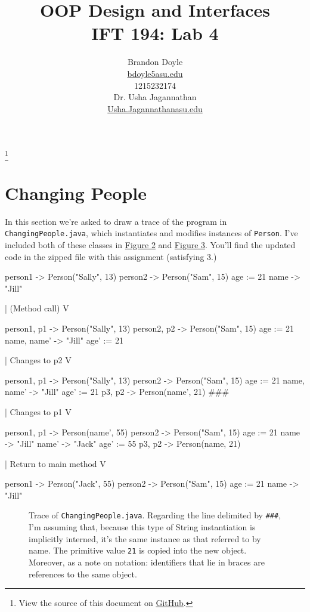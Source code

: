 \documentclass[leqno, 11pt]{article}
\title{\vspace{6ex}OOP Design and Interfaces\\
  \Large IFT 194: Lab 4}
\author{Brandon Doyle\\
\href{mailto:bdoyle@asu.edu}{bdoyle5\at{}asu.edu}\\
1215232174\\[1em]
Dr. Usha Jagannathan\\
\href{mailto:Usha.Jagannathan@asu.edu}{Usha.Jagannathan\at{}asu.edu}}
\newcommand\blfootnote[1]{%
  \begingroup
    \renewcommand\thefootnote{}\footnote{#1}
    \addtocounter{footnote}{-1}
  \endgroup
}
\begin{document}
\begin{titlepage}
\clearpage\maketitle
\thispagestyle{empty}
\end{titlepage}
\tableofcontents
\blfootnote{View the source of this document on \href{https://github.com/bjd2385/IFT_194_labs/blob/master/\jobname.tex}{GitHub}.}
\newpage
\section{Changing People}
In this section we're asked to draw a trace of the program in \texttt{ChangingPeople.java}, which instantiates and modifies instances of \texttt{Person}. I've included both of these classes in \hyperref[fig:one]{Figure 2} and \hyperref[fig:two]{Figure 3}. You'll find the updated code in the zipped file with this assignment (satisfying 3.)
\begin{verbbox}[\mbox{}\scriptsize]
person1 -> Person("Sally", 13)
person2 -> Person("Sam", 15)
age := 21
name -> "Jill"

               |  (Method call)
               V

{ person1, p1 } -> Person("Sally", 13)
{ person2, p2 } -> Person("Sam", 15)
age := 21
{ name, name' } -> "Jill"
age' := 21

               |  Changes to p2
               V

{ person1, p1 } -> Person("Sally", 13)
person2 -> Person("Sam", 15)
age := 21
{ name, name' } -> "Jill"
age' := 21
{ p3, p2 } -> Person(name', 21)  ###

               |  Changes to p1
               V

{ person1, p1 } -> Person(name', 55)
person2 -> Person("Sam", 15)
age := 21
name -> "Jill"
name' -> "Jack"
age' := 55
{ p3, p2 } -> Person(name, 21)

               |  Return to main method
               V

person1 -> Person("Jack", 55)
person2 -> Person("Sam", 15)
age := 21
name -> "Jill"
\end{verbbox}
\begin{figure}[h!]
  \centering
  \theverbbox
  \caption{Trace of \texttt{ChangingPeople.java}. Regarding the line delimited by \texttt{\#\#\#}, I'm assuming that, because this type of String instantiation is implicitly interned, it's the same instance as that referred to by name. The primitive value \texttt{21} is copied into the new object. Moreover, as a note on notation: identifiers that lie in braces are references to the same object.}
\end{figure}
\end{document}
